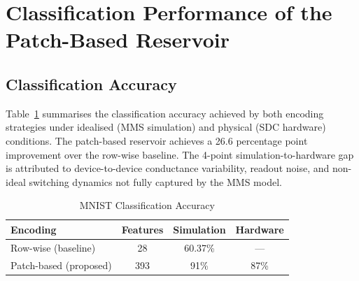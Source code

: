 \documentclass[11pt, oneside]{article}
\begin{document}


\section{Classification Performance of the Patch-Based Reservoir}
\subsection{Classification Accuracy}
 
Table~\ref{tab:accuracy} summarises the classification accuracy achieved by both encoding
strategies under idealised (MMS simulation) and physical (SDC hardware) conditions.
The patch-based reservoir achieves a 26.6 percentage point improvement over the row-wise
baseline. The 4-point simulation-to-hardware gap is attributed to device-to-device
conductance variability, readout noise, and non-ideal switching dynamics not fully
captured by the MMS model.
 
\begin{table}[!t]
  \renewcommand{\arraystretch}{1.3}
  \caption{MNIST Classification Accuracy}
  \label{tab:accuracy}
  \centering
  \begin{tabular}{lccc}
    \hline
    \bfseries Encoding & \bfseries Features & \bfseries Simulation & \bfseries Hardware \\
    \hline
    Row-wise (baseline)    & 28  & 60.37\% & ---  \\
    Patch-based (proposed) & 393 & 91\%    & 87\% \\
    \hline
  \end{tabular}
\end{table}
 
\end{document}
